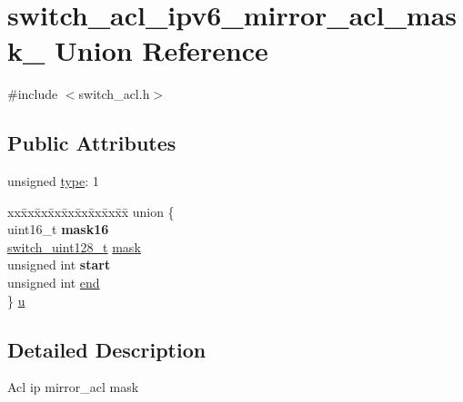 \hypertarget{unionswitch__acl__ipv6__mirror__acl__mask__}{\section{switch\+\_\+acl\+\_\+ipv6\+\_\+mirror\+\_\+acl\+\_\+mask\+\_\+ Union Reference}
\label{unionswitch__acl__ipv6__mirror__acl__mask__}
}


{\ttfamily \#include $<$switch\+\_\+acl.\+h$>$}

\subsection*{Public Attributes}
\begin{DoxyCompactItemize}
\item 
unsigned \hyperlink{unionswitch__acl__ipv6__mirror__acl__mask___a8223861faac12345d868145174df0057}{type}\+: 1
\item 
\begin{tabbing}
xx\=xx\=xx\=xx\=xx\=xx\=xx\=xx\=xx\=\kill
union \{\\
\>uint16\_t {\bfseries mask16}\\
\>\hyperlink{structswitch__uint128__t}{switch\_uint128\_t} \hyperlink{unionswitch__acl__ipv6__mirror__acl__mask___a718e008ff33e808e2bcb9473db3834a5}{mask}\\
\>unsigned int {\bfseries start}\\
\>unsigned int \hyperlink{unionswitch__acl__ipv6__mirror__acl__mask___abb536553c4bb65858613c9e77457a5e0}{end}\\
\} \hyperlink{unionswitch__acl__ipv6__mirror__acl__mask___a24716979a35038a2992532dc6d55dd38}{u}\\

\end{tabbing}\end{DoxyCompactItemize}


\subsection{Detailed Description}
Acl ip mirror\+\_\+acl mask 


